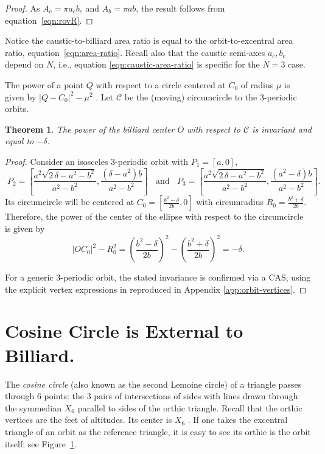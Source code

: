 \documentclass{amsart}
\newtheorem{theorem}{Theorem}
\theoremstyle{definition}
\begin{document}
\begin{proof}
As $A_c=\pi{a_c}{b_c}$ and $A_b={\pi}{a}{b}$, the result follows from equation~\eqref{eqn:rovR}.
\end{proof}

  Notice the caustic-to-billiard area ratio is equal to the orbit-to-excentral area ratio, equation~\eqref{eqn:area-ratio}. Recall also that the caustic semi-axes $a_c,b_c$ depend on $N$, i.e., equation  \eqref{eqn:caustic-area-ratio} is specific for the $N=3$ case.

The power of a point $Q$ with respect to a circle centered at $C_0$ of radius $\mu$ is given by $|Q-C_0|^2-\mu^2$ \cite[Circle Power]{mw}. Let $\mathcal{C}$ be the (moving) circumcircle to the 3-periodic orbits.

\begin{theorem}\label{thm:power_delta}
The power of the billiard center $O$ with respect to $\mathcal{C}$ is invariant and equal to $-\delta$.
\label{thm:delta-power}
\end{theorem}

\begin{proof}
 Consider an isosceles 3-periodic orbit with $P_1=[a,0]$,
 {\small  
 \[  \;  P_2   =\left[\frac {{a}^{2}\sqrt {2\,\delta-{a}^{2}-{b}^{2}}}{{a}^{2}-{b}^{2}},   
	\frac { \left(\delta  -{a}^{2}\right) b}{{a}^{2}-{b}^{2}}\right]\;\;
	 \text{ and  }\;\;  P_3= \left[{\frac {{a}^{2}\sqrt {2\,\delta-{a}^{2}-{b}^{2} }}{{a}^{2}-{b}^{2}}},
	{\frac { \left(  {a}^{2}-\delta \right) b}{{a}^{2}-{b}^{2}}}\right].
	\]
 }%
	Its circumcircle will be centered at $C_0=[ {\frac { {b}^{2}-\delta}{2b}},0]$ with circumradius $R_0=\frac {{b}^{2}+\delta}{2b}.$
	Therefore, the power of the center of the ellipse with respect to the circumcircle is given by  
	$$|OC_0|^2-R_0^2=\left(\frac { {b}^{2}-\delta}{2b}\right)^2 - \left(\frac {{b}^{2}+\delta}{2b}\right)^2=-\delta.$$

For a generic 3-periodic orbit, the stated invariance is confirmed via a CAS, using the explicit vertex expressions in \cite{garcia2019-ellipses} reproduced in Appendix \ref{app:orbit-vertices}.
\end{proof}

\section{Cosine Circle is External to Billiard.}
\label{sec:cosine-circle}
The {\em cosine circle} (also known as the second Lemoine circle) \cite[Cosine Circle]{mw} of a triangle passes through 6 points: the 3 pairs of intersections of sides with lines drawn through the symmedian $X_6$ parallel to sides of the orthic triangle. Recall that the orthic vertices are the feet of altitudes. Its center is $X_6$ \cite[Cosine Circle]{mw}. If one takes the excentral triangle of an orbit as the reference triangle, it is easy to see its orthic is the orbit itself; see Figure~\ref{sec:cosine-circle}.
\end{document}
